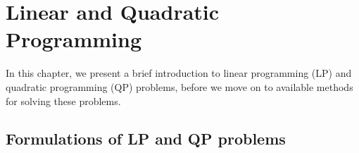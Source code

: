 \chapter{Linear and Quadratic Programming}
\label{ch:background}

In this chapter, we present a brief introduction to linear programming (LP)
and quadratic programming (QP) problems, before we move on to
available methods for solving these problems.

\section{Formulations of LP and QP problems}
\label{sec:backlp}


%
